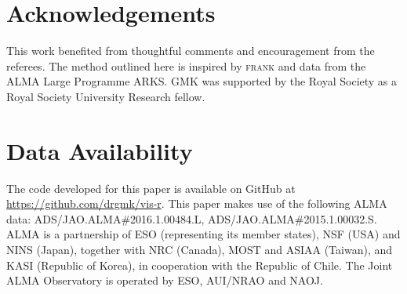 \documentclass[fleqn,usenatbib]{mnras}
\begin{document}
\section*{Acknowledgements}

This work benefited from thoughtful comments and encouragement from the referees. The method outlined here is inspired by \textsc{frank} \citep{2020MNRAS.tmp.1491J} and data from the ALMA Large Programme ARKS. GMK was supported by the Royal Society as a Royal Society University Research fellow.

\section*{Data Availability}

The code developed for this paper is available on GitHub at \href{https://github.com/drgmk/vis-r}{https://github.com/drgmk/vis-r}. This paper makes use of the following ALMA data: ADS/JAO.ALMA\#2016.1.00484.L, ADS/JAO.ALMA\#2015.1.00032.S. ALMA is a partnership of ESO (representing its member states), NSF (USA) and NINS (Japan), together with NRC (Canada), MOST and ASIAA (Taiwan), and KASI (Republic of Korea), in cooperation with the Republic of Chile. The Joint ALMA Observatory is operated by ESO, AUI/NRAO and NAOJ.







\appendix


\end{document}
